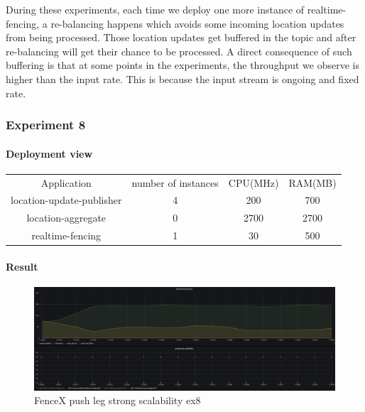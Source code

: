 \documentclass[a4]{report}
\begin{document}
        During these experiments, each time we deploy one more instance of realtime-fencing, a re-balancing happens which
        avoids some incoming location updates from being processed.
        Those location updates get buffered in the topic and after re-balancing will get their chance to be processed.
        A direct consequence of such buffering is that at some points in the experiments, the throughput we observe is
        higher than the input rate.
        This is because the input stream is ongoing and fixed rate.

        \subsubsection{Experiment 8}

        \paragraph{Deployment view}
        \begin{center}
            \begin{tabular}{ c c c c }
                Application               & number of instances & CPU(MHz) & RAM(MB) \\
                location-update-publisher & 4                   & 200      & 700     \\
                location-aggregate        & 0                   & 2700     & 2700    \\
                realtime-fencing          & 1                   & 30       & 500     \\
            \end{tabular}
        \end{center}

        \paragraph{Result}
        \begin{figure}[ht]
            \caption{FenceX push leg strong scalability ex8}
            \label{fig:ex8}
            \includegraphics[scale=0.4]{images/evaluation/ex8-benchmarking-ongoing-2per4sec.png}
        \end{figure}
\end{document}
